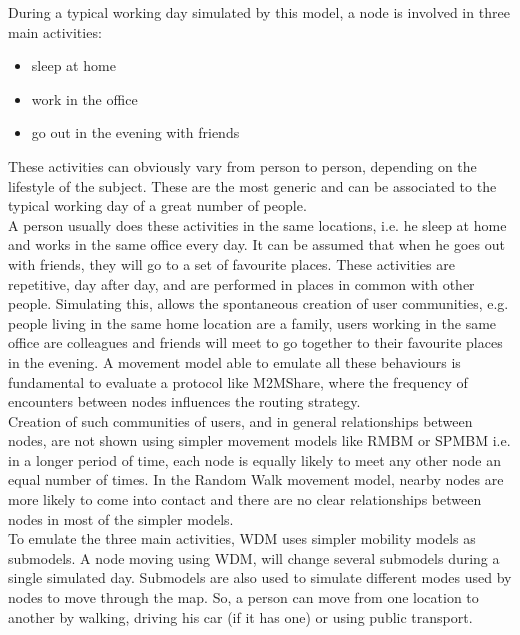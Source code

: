 During a typical working day simulated by this model, a node is involved in three main activities:
\begin{itemize}
\item sleep at home
\item work in the office
\item go out in the evening with friends
\end{itemize}
These activities can obviously vary from person to person, depending on the lifestyle of the subject. These are the most generic and can be associated to the typical working day of a great number of people.
\\

A person usually does these activities in the same locations, i.e. he sleep at home and works in the same office every day. It can be assumed that when he goes out with friends, they will go to a set of favourite places. These activities are repetitive, day after day, and are performed in places in common with other people. Simulating this, allows the spontaneous creation of user communities, e.g. people living in the same home location are a family, users working in the same office are colleagues and friends will meet to go together to their favourite places in the evening. A movement model able to emulate all these behaviours is fundamental to evaluate a protocol like M2MShare, where the frequency of encounters between nodes influences the routing strategy.\\

Creation of such communities of users, and in general relationships between nodes, are not shown using simpler movement models like RMBM or SPMBM i.e. in a longer period of time, each node is equally likely to meet any other node an equal number of times. In the Random Walk movement model, nearby nodes are more likely to come into contact and there are no clear relationships between nodes in most of the simpler models.
\\

To emulate the three main activities, WDM uses simpler mobility models as submodels. A node moving using WDM, will change several submodels during a single simulated day. Submodels are also used to simulate different modes used by nodes to move through the map. So, a person can move from one location to another by walking, driving his car (if it has one) or using public transport.
\\


